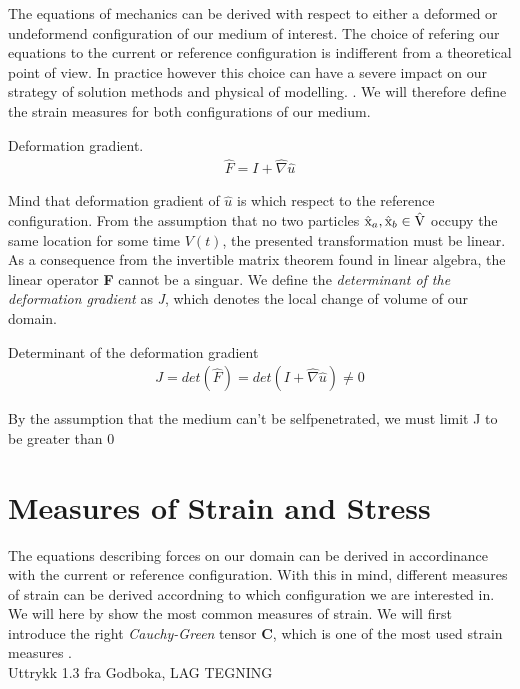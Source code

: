 The equations of mechanics can be derived with respect to either a deformed or undeformend configuration of our medium of interest. The choice of refering our equations to the current or reference configuration is indifferent from a theoretical point of view. In practice however this choice can have a severe impact on our strategy of solution methods and physical of modelling.   \cite{Wriggers2006}. We will therefore define the strain measures for both configurations of our medium.  

\begin{defn}
Deformation gradient. 
\begin{align}
\hat{F} = I + \hat{\nabla} \hat{u} 
\end{align} 
\end{defn}

Mind that deformation gradient of $\hat{u}$ is which respect to the reference configuration. 
From the assumption that no two particles $\text{\^{x}}_a, \text{\^{x}}_b \in \text{\^{V}}$ occupy the same location for some time $V(t)$, the presented transformation must be linear. As a consequence from the invertible matrix theorem found in linear algebra, the linear operator \textbf{F} cannot be a singuar.  
We define the  \textit{determinant of the deformation gradient} as \textit{J}, which denotes the local change of volume of our domain. 

\begin{defn}
Determinant of the deformation gradient
\begin{align}
J = det(\hat{F}) = det( I + \hat{\nabla} \hat{u} ) \neq 0
\end{align} 
\end{defn}


By the assumption that the medium can't be selfpenetrated, we must limit  J to be greater than 0 \cite{Wriggers2006}

\section{Measures of Strain and Stress}
The equations describing forces on our domain can be derived in accordinance with the current or reference configuration. With this in mind, different measures of strain can be derived accordning to which configuration we are interested in. We will here by \cite{Richter2016} show the most common measures of strain. We will first introduce the right \textit{Cauchy-Green} tensor \textbf{C}, which is one of the most used strain measures \cite{Wriggers2006}. \\ Uttrykk 1.3 fra Godboka, LAG TEGNING \\ 


